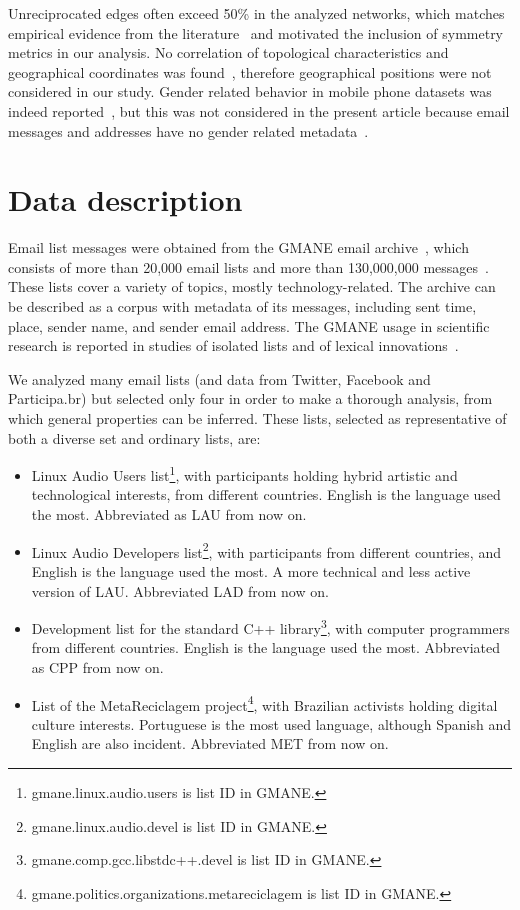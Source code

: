 \documentclass[%
	aip,
	jmp,%
	amsmath,amssymb,
	reprint,%
]{revtex4-1}
\begin{document}
Unreciprocated edges often exceed 50\% in the analyzed networks, which matches empirical evidence from the literature~\cite{newmanEvolving} and motivated the inclusion of symmetry metrics in our analysis. No correlation of topological characteristics and geographical coordinates was found~\cite{barabasiGeo}, therefore geographical positions were not considered in our study. Gender related behavior in mobile phone datasets was indeed reported~\cite{barabasiSex}, but this was not considered in the present article because email messages and addresses have no gender related metadata~\cite{gmanePack}.


\section{Data description}\label{sec:data}

Email list messages were obtained from
the GMANE email archive~\cite{gmanePack}, which consists of more than 20,000 email lists and more than 130,000,000 messages~\cite{GMANEwikipedia}. These lists cover a variety of topics, mostly technology-related. The archive can be described as a corpus with metadata of its messages, including sent time, place, sender name, and sender email address.
The GMANE usage in scientific research is reported in studies of isolated lists and of lexical innovations~\cite{GMANE2,bird}. 

We analyzed many email lists (and data from Twitter, Facebook and Participa.br) but selected only four in order to make a thorough analysis, from which general properties can be inferred. These lists, selected as representative of both a diverse set and ordinary lists, are:
\begin{itemize}
	\item Linux Audio Users list\footnote{gmane.linux.audio.users is list ID in GMANE.}, with participants holding hybrid artistic and technological interests, from different countries. English is the language used the most. Abbreviated as LAU from now on.
	\item Linux Audio Developers list\footnote{gmane.linux.audio.devel is list ID in GMANE.}, with participants from different countries, and English is the language used the most. A more technical and less active version of LAU. Abbreviated LAD from now on.
	\item Development list for the standard C++ library\footnote{gmane.comp.gcc.libstdc++.devel is list ID in GMANE.}, with computer programmers from different countries. English is the language used the most. Abbreviated as CPP from now on.
	\item List of the MetaReciclagem project\footnote{gmane.politics.organizations.metareciclagem is list ID in GMANE.}, with Brazilian activists holding digital culture interests. Portuguese is the most used language, although Spanish and English are also incident. Abbreviated MET from now on.
\end{itemize} 
\end{document}

